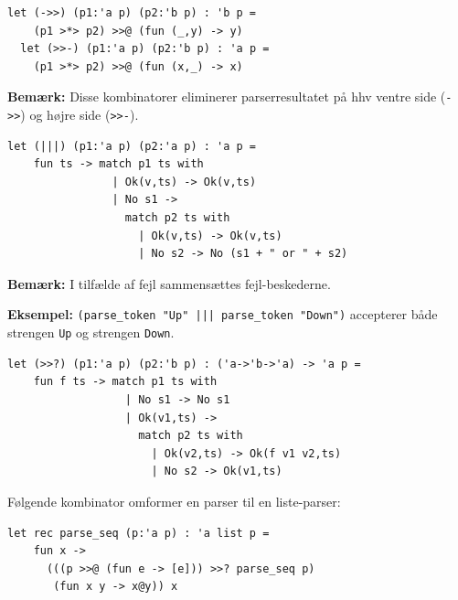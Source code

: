 \documentclass[rgb]{beamer}
\begin{document}
\begin{frame}[fragile]
\begin{footnotesize}


\begin{lstlisting}[numbers=none,frame=none,mathescape]
  let (->>) (p1:'a p) (p2:'b p) : 'b p =
    (p1 >*> p2) >>@ (fun (_,y) -> y)
  let (>>-) (p1:'a p) (p2:'b p) : 'a p =
    (p1 >*> p2) >>@ (fun (x,_) -> x)
\end{lstlisting}

\textbf{Bemærk:} Disse kombinatorer eliminerer parserresultatet på hhv
ventre side (\lstinline{->>}) og højre side (\lstinline{>>-}).


\begin{lstlisting}[numbers=none,frame=none,mathescape]
  let (|||) (p1:'a p) (p2:'a p) : 'a p =
    fun ts -> match p1 ts with
                | Ok(v,ts) -> Ok(v,ts)
                | No s1 ->
                  match p2 ts with
                    | Ok(v,ts) -> Ok(v,ts)
                    | No s2 -> No (s1 + " or " + s2)
\end{lstlisting}

\textbf{Bemærk:} I tilfælde af fejl sammensættes fejl-beskederne.

\vspace{1ex}
\textbf{Eksempel:} \lstinline{(parse_token "Up" ||| parse_token "Down")} accepterer både strengen \lstinline{Up} og strengen \lstinline{Down}.

\end{footnotesize}
\end{frame}

\begin{frame}[fragile]
\begin{footnotesize}


\begin{lstlisting}[numbers=none,frame=none,mathescape]
  let (>>?) (p1:'a p) (p2:'b p) : ('a->'b->'a) -> 'a p =
    fun f ts -> match p1 ts with
                  | No s1 -> No s1
                  | Ok(v1,ts) ->
                    match p2 ts with
                      | Ok(v2,ts) -> Ok(f v1 v2,ts)
                      | No s2 -> Ok(v1,ts)
\end{lstlisting}


Følgende kombinator omformer en parser til en liste-parser:

\begin{lstlisting}[numbers=none,frame=none,mathescape]
  let rec parse_seq (p:'a p) : 'a list p =
    fun x ->
      (((p >>@ (fun e -> [e])) >>? parse_seq p)
       (fun x y -> x@y)) x
\end{lstlisting}

\end{footnotesize}
\end{frame}
\end{document}
